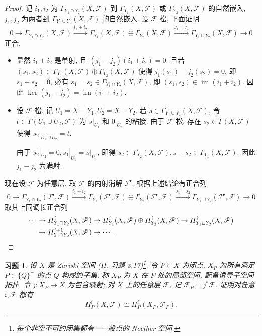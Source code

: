 \documentclass{article}
\theoremstyle{exercise}
\newtheorem{exercise}{习题}[section]
\theoremstyle{theorem}
\theoremstyle{remark}
\def\cF{\mathscr{F}}
\def\cI{\mathscr{I}}
\def\im{\operatorname{im}}
\begin{document}
\begin{proof}
  记 $i_1, i_2$ 为 $\Gamma_{Y_1 \cap Y_2}(X, \cF)$ 到
  $\Gamma_{Y_1}(X, \cF)$ 或 $\Gamma_{Y_2}(X, \cF)$ 的自然嵌入,
  $j_1, j_2$ 为两者到 $\Gamma_{Y_1 \cup Y_2}(X, \cF)$ 的自然嵌入.
  设 $\cF$ 松, 下面证明
  \[
    0 \to \Gamma_{Y_1 \cap Y_2}(X, \cF)
    \xrightarrow{i_1 + i_2} \Gamma_{Y_1}(X, \cF) \oplus \Gamma_{Y_2}(X, \cF)
    \xrightarrow{j_1 - j_2} \Gamma_{Y_1 \cup Y_2}(X, \cF) \to 0
  \]
  正合.

  \begin{itemize}
    \item 显然 $i_1 + i_2$ 是单射, 且 $(j_1 - j_2)(i_1 + i_2) = 0$.
          且若 $(s_1, s_2) \in \Gamma_{Y_1}(X, \cF) \oplus \Gamma_{Y_2}(X, \cF)$
          使得 $j_1(s_1) - j_2(s_2) = 0$, 即 $s_1 - s_2 = 0$,
          必有 $s_1 = s_2 \in \Gamma_{Y_1 \cap Y_2}(X, \cF)$,
          即 $(s_1, s_2) \in \im(i_1 + i_2)$.
          因此 $\ker(j_1 - j_2) = \im(i_1 + i_2)$.
    \item 设 $\cF$ 松. 记 $U_1 = X - Y_1, U_2 = X - Y_2$.
          若 $s \in \Gamma_{Y_1 \cup Y_2}(X, \cF)$,
          令 $t \in \Gamma(U_1 \cup U_2, \cF)$
          为 $s|_{U_1}$ 和 $0|_{U_2}$ 的粘接.
          由于 $\cF$ 松, 存在 $s_2 \in \Gamma(X, \cF)$
          使得 $s_2|_{U_1 \cup U_2} = t$.

          由于 $s_2|_{U_2} = 0, s_1|_{U_1} = s|_{U_1}$,
          即得 $s_2 \in \Gamma_{Y_2}(X, \cF), s - s_2 \in \Gamma_{Y_1}(X, \cF)$.
          因此 $j_1 - j_2$ 为满射.
  \end{itemize}

  现在设 $\cF$ 为任意层. 取 $\cF$ 的内射消解 $\cI^\bullet$, 根据上述结论有正合列
  \[
    0 \to \Gamma_{Y_1 \cap Y_2}(\cI^\bullet, \cF)
    \xrightarrow{i_1 + i_2} \Gamma_{Y_1}(\cI^\bullet, \cF) \oplus \Gamma_{Y_2}(\cI^\bullet, \cF)
    \xrightarrow{j_1 - j_2} \Gamma_{Y_1 \cup Y_2}(\cI^\bullet, \cF) \to 0
  \]
  取其上同调长正合列
    \begin{align*}
      \cdots & \to H^i_{Y_1 \cap Y_2}(X, \cF)
               \to H^i_{Y_1}(X, \cF) \oplus H^i_{Y_2}(X, \cF)
               \to H^i_{Y_1 \cup Y_2}(X, \cF) \\
             & \to H^{i+1}_{Y_1 \cap Y_2}(X, \cF) \to \cdots.
    \qedhere
    \end{align*}
\end{proof}

\begin{exercise}
  设 $X$ 是 Zariski 空间 (II, 习题 3.17)\footnote{每个非空不可约闭集都有一一般点的 Noether 空间.}.
  令 $P \in X$ 为闭点, $X_P$ 为所有满足 $P \in \{Q\}^-$ 的点 $Q$ 构成的子集.
  称 $X_P$ 为 $X$ 在 $P$ 处的\emph{局部空间}, 配备诱导子空间拓扑.
  令 $j \colon X_P \to X$ 为包含映射; 对 $X$ 上的任意层 $\cF$, 记 $\cF_P = j^* \cF$.
  证明对任意 $i, \cF$ 都有
  \[
    H_P^i(X, \cF) \cong H_P^i(X_P, \cF_P).
  \]
\end{exercise}
\end{document}
